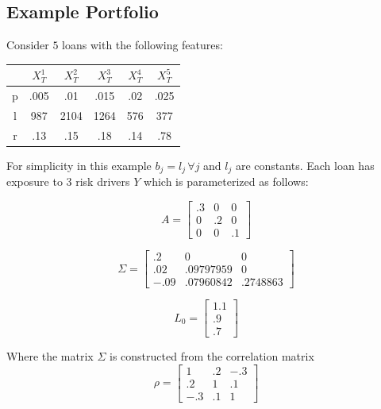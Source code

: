 \documentclass[12pt]{article}
\theoremstyle{definition}
\begin{document}
\subsection{Example Portfolio}
Consider \(5\) loans with the following features:

\begin{table}[H]
\centering
\begin{tabular}{cccccc}
&\(X_T^1\) & \(X_T^2\)& \(X_T^3\)& \(X_T^4\)& \(X_T^5\) \\
\hline
p& .005 & .01& .015& .02& .025 \\
l & 987 &2104 & 1264 & 576 &377 \\
r & .13 & .15 & .18 & .14 & .78 \\
\end{tabular}
\end{table}

For simplicity in this example \(b_j=l_j\, \forall j\) and \(l_j\) are constants.  Each loan has exposure to 3 risk drivers \(Y\) which is parameterized as follows:

\begin{equation}
{A}=\left[ \begin{array}{ccc} .3 & 0& 0 \\ 0 & .2 & 0 \\ 0 & 0 & .1 \end{array} \right]
\end{equation}

\begin{equation}
{\Sigma}=\left[\begin{array}{ccc} .2 & 0 & 0 \\ .02 & .09797959 & 0 \\ -.09 & .07960842 & .2748863 \end{array}\right]
\end{equation}

\begin{equation}
{L}_0=\left[ \begin{array}{c}1.1\\.9\\.7 \end{array} \right]
\end{equation}

Where the matrix \({\Sigma}\) is constructed from the correlation matrix
\begin{equation}
{\rho}=\left[\begin{array}{ccc} 1 & .2 & -.3 \\ .2 & 1 & .1 \\ -.3 & .1 & 1 \end{array}\right]
\end{equation}
\end{document}
